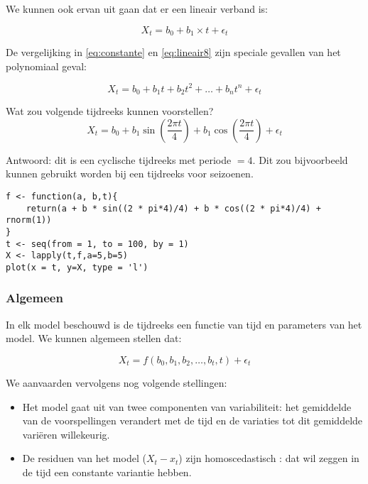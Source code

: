 We kunnen ook ervan uit gaan dat er een lineair verband is:

\begin{equation}
X_{t} = b_{0} + b_{1} \times t + \epsilon_{t}
\label{eq:lineair8}
\end{equation}

De vergelijking in \ref{eq:constante} en \ref{eq:lineair8} zijn speciale gevallen van het polynomiaal geval:

\begin{equation}
	X_{t} = b_{0} + b_{1} t + b_{2} t^{2} + \dots + b_{n} t^{n} + \epsilon_{t} 
\label{eq:polynomiaal}
\end{equation}

\begin{exercise}
	Wat zou volgende tijdreeks kunnen voorstellen?
	\begin{equation}
		X_{t} = b_{0} + b_{1} \sin\left(\frac{2\pi t}{4}\right) + b_{1} \cos\left(\frac{2\pi t}{4}\right) + \epsilon_{t}
	\label{eq:seasonal}
\end{equation}
\end{exercise}

Antwoord: dit is een cyclische tijdreeks met periode $= 4$. Dit zou bijvoorbeeld kunnen gebruikt worden bij een tijdreeks voor seizoenen. 

\begin{lstlisting}
f <- function(a, b,t){
	return(a + b * sin((2 * pi*4)/4) + b * cos((2 * pi*4)/4) + rnorm(1))
}
t <- seq(from = 1, to = 100, by = 1)
X <- lapply(t,f,a=5,b=5)
plot(x = t, y=X, type = 'l')
\end{lstlisting}

\subsubsection{Algemeen}

In elk model beschouwd is de tijdreeks een functie van tijd en parameters van het model. We kunnen algemeen stellen dat:

\begin{equation}
	X_{t} = f(b_{0}, b_{1}, b_{2}, \dots , b_{t}, t) + \epsilon_{t}
\label{eq:general}
\end{equation}

We aanvaarden vervolgens nog volgende stellingen:

\begin{itemize}
	\item Het model gaat uit van twee componenten van variabiliteit: het gemiddelde van de voorspellingen verandert met de tijd en de variaties tot dit gemiddelde variëren willekeurig.
	\item De residuen van het model ($X_{t} - x_{t}$) zijn homoscedastisch : dat wil zeggen in de tijd een constante variantie hebben.
\end{itemize}

